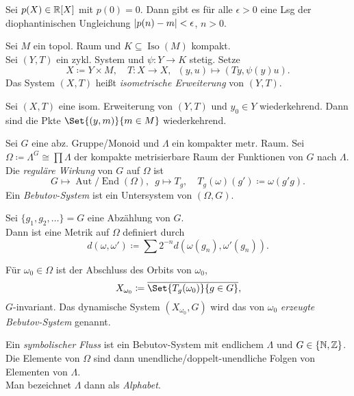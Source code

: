 \documentclass{cheat-sheet}
\DeclareMathOperator{\Aut}{Aut} %
\DeclareMathOperator{\End}{End} %
\newcommand{\AutEnd}{\Aut\!/\!\End} %
\DeclareMathOperator{\Iso}{Iso} %
\newcommand{\clos}[1]{\overline{#1}} %
\begin{document}
\begin{prop}
  Sei $p(X) \in \mathbb{R}[X]$ mit $p(0) = 0$. Dann gibt es für alle $\epsilon > 0$ eine Lsg der diophantinischen Ungleichung
  $\lvert p(n) - m\rvert < \epsilon$, $n > 0$.
\end{prop}

\begin{defn}
  Sei $M$ ein topol. Raum und $K \subseteq \Iso(M)$ kompakt. \\
  Sei $(Y, T)$ ein zykl. System und $\psi : Y \to K$ stetig. Setze
  \[
    X \coloneqq Y \!\times\! M, \quad
    T : X \to X, \enspace (y, u) \mapsto (Ty, \psi(y)u).
  \]
  Das System $(X, T)$ heißt \emph{isometrische Erweiterung} von $(Y, T)$.
\end{defn}

\begin{prop}
  Sei $(X, T)$ eine isom. Erweiterung von $(Y, T)$ und $y_0 \in Y$ wiederkehrend.
  Dann sind die Pkte $\Set{(y, m)}{m \in M}$ wiederkehrend.
\end{prop}


\begin{defn}
  Sei $G$ eine abz. Gruppe/Monoid und $\Lambda$ ein kompakter metr. Raum.
  Sei $\Omega \coloneqq \Lambda^G \cong \prod \Lambda$ der kompakte metrisierbare Raum der Funktionen von $G$ nach $\Lambda$. Die \emph{reguläre Wirkung} von $G$ auf $\Omega$ ist
  \[
    G \mapsto \AutEnd(\Omega), \enspace g \mapsto T_g, \quad
    T_g(\omega)(g') \coloneqq \omega(g'g).
  \]
  Ein \emph{Bebutov-System} ist ein Untersystem von $(\Omega, G)$.
\end{defn}

\begin{bem}
  Sei $\{ g_1, g_2, \ldots \} = G$ eine Abzählung von $G$. \\
  Dann ist eine Metrik auf $\Omega$ definiert durch
  \[ d(\omega, \omega') \coloneqq \sum 2^{-n} d(\omega(g_n), \omega'(g_n)). \]
\end{bem}

\begin{defn}
  Für $\omega_0 \in \Omega$ ist der Abschluss des Orbits von $\omega_0$,
  \[ X_{\omega_0} \coloneqq \clos{\Set{T_g(\omega_0)}{g \in G}}, \]
  $G$-invariant. Das dynamische System $(X_{\omega_0}, G)$ wird das von $\omega_0$ \emph{erzeugte Bebutov-System} genannt.
\end{defn}

\begin{defn}
  Ein \emph{symbolischer Fluss} ist ein Bebutov-System mit endlichem $\Lambda$ und $G \in \{ \mathbb{N}, \mathbb{Z} \}$.
  Die Elemente von $\Omega$ sind dann unendliche/doppelt-unendliche Folgen von Elementen von $\Lambda$. \\
  Man bezeichnet $\Lambda$ dann als \emph{Alphabet}.
\end{defn}
\end{document}
